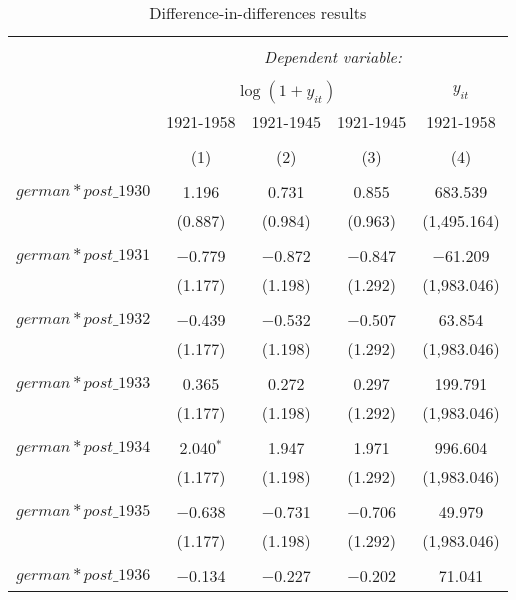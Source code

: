 
\begin{table}[!htbp] \centering 
  \caption{Difference-in-differences results} 
  \label{dif_table} 
\begin{tabular}{@{\extracolsep{5pt}}lcccc} 
\\[-1.8ex]\hline 
\hline \\[-1.8ex] 
 & \multicolumn{4}{c}{\textit{Dependent variable:}} \\ 
\cline{2-5} 
\\[-1.8ex] & \multicolumn{3}{c}{$\log(1 + y_{it})$} & $y_{it}$ \\ 
 & 1921-1958 & 1921-1945 & 1921-1945 & 1921-1958 \\ 
\\[-1.8ex] & (1) & (2) & (3) & (4)\\ 
\hline \\[-1.8ex] 
 $german*post\_1930$ & 1.196 & 0.731 & 0.855 & 683.539 \\ 
  & (0.887) & (0.984) & (0.963) & (1,495.164) \\ 
  & & & & \\ 
 $german*post\_1931$ & $-$0.779 & $-$0.872 & $-$0.847 & $-$61.209 \\ 
  & (1.177) & (1.198) & (1.292) & (1,983.046) \\ 
  & & & & \\ 
 $german*post\_1932$ & $-$0.439 & $-$0.532 & $-$0.507 & 63.854 \\ 
  & (1.177) & (1.198) & (1.292) & (1,983.046) \\ 
  & & & & \\ 
 $german*post\_1933$ & 0.365 & 0.272 & 0.297 & 199.791 \\ 
  & (1.177) & (1.198) & (1.292) & (1,983.046) \\ 
  & & & & \\ 
 $german*post\_1934$ & 2.040$^{*}$ & 1.947 & 1.971 & 996.604 \\ 
  & (1.177) & (1.198) & (1.292) & (1,983.046) \\ 
  & & & & \\ 
 $german*post\_1935$ & $-$0.638 & $-$0.731 & $-$0.706 & 49.979 \\ 
  & (1.177) & (1.198) & (1.292) & (1,983.046) \\ 
  & & & & \\ 
 $german*post\_1936$ & $-$0.134 & $-$0.227 & $-$0.202 & 71.041 \\ 

\end{tabular}
\end{table}
